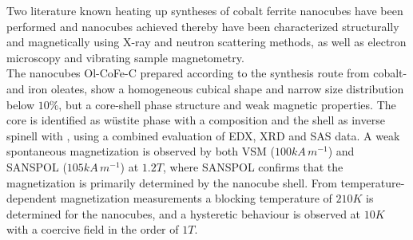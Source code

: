 \documentclass[\main/dresen_thesis.tex]{subfiles}
\begin{document}
  \label{sec:monolayers:nanoparticle:discussion:summary}
  Two literature known heating up syntheses of cobalt ferrite nanocubes have been performed and nanocubes achieved thereby have been characterized structurally and magnetically using X-ray and neutron scattering methods, as well as electron microscopy and vibrating sample magnetometry.
  \\

  The nanocubes Ol-CoFe-C prepared according to the synthesis route from cobalt- and iron oleates, show a homogeneous cubical shape and narrow size distribution below $10 \%$, but a core-shell phase structure and weak magnetic properties.
  The core is identified as w\"ustite phase with a  composition and the shell as inverse spinell with , using a combined evaluation of EDX, XRD and SAS data.
  A weak spontaneous magnetization is observed by both VSM ($100 \unit{kA \, m^{-1}}$) and SANSPOL ($105 \unit{kA \, m^{-1}}$) at $1.2 \unit{T}$, where SANSPOL confirms that the magnetization is primarily determined by the nanocube shell.
  From temperature-dependent magnetization measurements a blocking temperature of $210 \unit{K}$ is determined for the nanocubes, and a hysteretic behaviour is observed at $10 \unit{K}$ with a coercive field in the order of $1 \unit{T}$.
  \\
\end{document}
